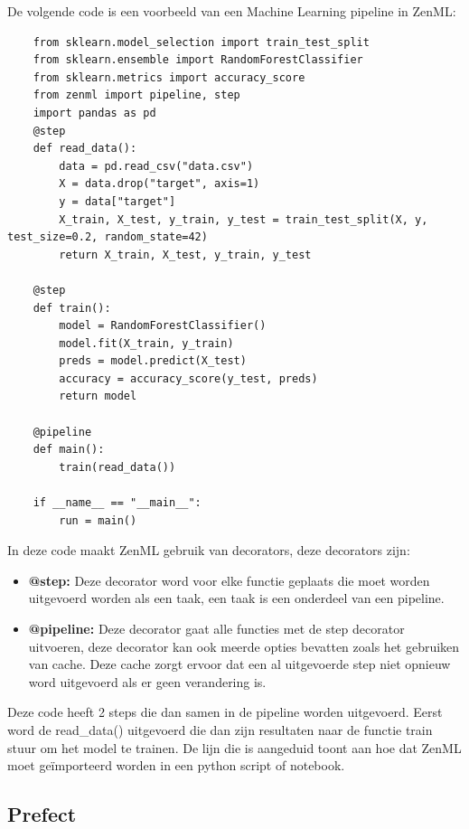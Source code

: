 De volgende code is een voorbeeld van een Machine Learning pipeline in ZenML:

\begin{verbatim}
    from sklearn.model_selection import train_test_split
    from sklearn.ensemble import RandomForestClassifier
    from sklearn.metrics import accuracy_score
    from zenml import pipeline, step
    import pandas as pd
    @step
    def read_data():
        data = pd.read_csv("data.csv")
        X = data.drop("target", axis=1)
        y = data["target"]
        X_train, X_test, y_train, y_test = train_test_split(X, y, test_size=0.2, random_state=42)
        return X_train, X_test, y_train, y_test

    @step    
    def train():
        model = RandomForestClassifier()
        model.fit(X_train, y_train)
        preds = model.predict(X_test)
        accuracy = accuracy_score(y_test, preds)
        return model
    
    @pipeline
    def main():
        train(read_data())

    if __name__ == "__main__":
        run = main()
\end{verbatim}
In deze code maakt ZenML gebruik van decorators, deze decorators zijn:
\begin{itemize}
    \item \textbf{@step:} Deze decorator word voor elke functie geplaats die moet worden uitgevoerd worden als een taak, een taak is een onderdeel van een pipeline.
    \item \textbf{@pipeline:} Deze decorator gaat alle functies met de step decorator uitvoeren, deze decorator kan ook meerde opties bevatten zoals het gebruiken van cache. Deze cache zorgt ervoor dat een al uitgevoerde step niet opnieuw word uitgevoerd als er geen verandering is.
\end{itemize}

Deze code heeft 2 steps die dan samen in de pipeline worden uitgevoerd. Eerst word de read\_data() uitgevoerd die dan zijn resultaten naar de functie train stuur om het model te trainen.
De lijn die is aangeduid toont aan hoe dat ZenML moet geïmporteerd worden in een python script of notebook.
\subsection{Prefect}

